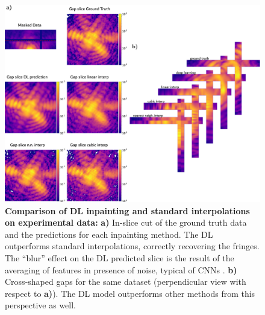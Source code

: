 
\begin{figure}[H]
    \centering
    \includegraphics[width=\textwidth]{figures/Inpainting/inslice_cross_interp.pdf}
    \caption{ \textbf{Comparison of DL inpainting and standard interpolations on experimental data:} \textbf{a)} In-slice 
    cut of the ground truth data and the predictions for each inpainting method. The DL outperforms standard interpolations, 
    correctly recovering the fringes. The ``blur'' effect on the DL predicted slice is the result of the averaging of features 
    in presence of noise, typical of CNNs \cite{Noise2Void}. \textbf{b)} Cross-shaped gaps for the same dataset (perpendicular 
    view with respect to \textbf{a)}). The DL model outperforms other methods from this perspective as well. }
    \label{fig:interp}
\end{figure}

\newpage 

